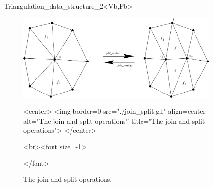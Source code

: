 \begin{ccRefClass}{Triangulation_data_structure_2<Vb,Fb>}
\begin{figure}[hb]
\begin{ccTexOnly}
\begin{center}
\includegraphics[width=0.9\textwidth]{TDS_2_ref/join_split}
\end{center}
\end{ccTexOnly}
\begin{ccHtmlOnly}
<center>
<img border=0 src="./join_split.gif" align=center
alt="The join and split operations''
title="The join and split operations">
</center>
\end{ccHtmlOnly}
\begin{ccHtmlOnly}
<br><font size=-1>
\end{ccHtmlOnly}
\caption{The join and split operations.}\label{fig-tds-split-join}
\begin{ccHtmlOnly}
</font>
\end{ccHtmlOnly}
\end{figure}


\end{ccRefClass}
